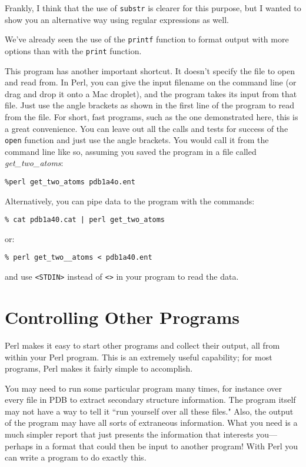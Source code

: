 Frankly, I think that the use of \verb|substr| is clearer for this purpose, but I wanted to show you an alternative way using regular expressions as well.

We've already seen the use of the \verb|printf| function to format output with more options than with the \verb|print| function.

This program has another important shortcut. It doesn't specify the file to open and read from. In Perl, you can give the input filename on the command line (or drag and drop it onto a Mac droplet), and the program takes its input from that file. Just use the angle brackets as shown in the first line of the program to read from the file. For short, fast programs, such as the one demonstrated here, this is a great convenience. You can leave out all the calls and tests for success of the \verb|open| function and just use the angle brackets. You would call it from the command line like so, assuming you saved the program in a file called \textit{get\_two\_atoms}: 

\begin{lstlisting}
%perl get_two_atoms pdb1a4o.ent
\end{lstlisting}

Alternatively, you can pipe data to the program with the commands:

\begin{lstlisting}
% cat pdb1a40.cat | perl get_two_atoms
\end{lstlisting}

or:

\begin{lstlisting}
% perl get_two__atoms < pdb1a40.ent 
\end{lstlisting}

and use \verb|<STDIN>| instead of \verb|<>| in your program to read the data. 

\section{Controlling Other Programs}
Perl makes it easy to start other programs and collect their output, all from within your Perl program. This is an extremely useful capability; for most programs, Perl makes it fairly simple to accomplish.

You may need to run some particular program many times, for instance over every file in PDB to extract secondary structure information. The program itself may not have a way to tell it ``run yourself over all these files." Also, the output of the program may have all sorts of extraneous information. What you need is a much simpler report that just presents the information that interests you—perhaps in a format that could then be input to another program! With Perl you can write a program to do exactly this.

